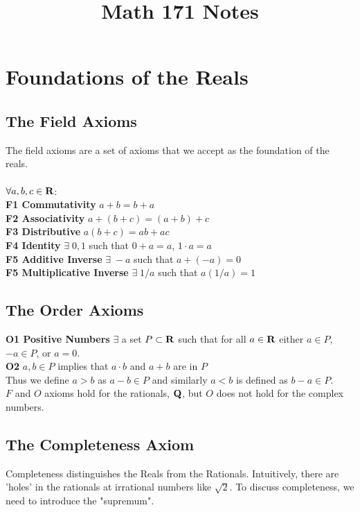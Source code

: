 \documentclass[12pt]{article}
\title{Math 171 Notes}
\begin{document}
\maketitle
\tableofcontents
\listoftodos
\newpage
\section{Foundations of the Reals}
  \subsection{The Field Axioms}
    The field axioms are a set of axioms that we accept as the foundation of the reals.\\\\
    $\forall a,b,c \in \mathbf{R}$:\\

    \textbf{F1 Commutativity}   $a+b = b+a$\\
    \textbf{F2 Associativity}  $a+(b +c) = (a+b)+c$\\
    \textbf{F3 Distributive}  $a(b +c) = ab+ac$\\
    \textbf{F4 Identity}  $\exists\;0,1$ such that $0 + a = a$, $1 \cdot a = a$ \\
    \textbf{F5 Additive Inverse}  $\exists\;-a$ such that $a + (-a) = 0$\\
    \textbf{F5 Multiplicative Inverse}  $\exists\;1/a$ such that $a(1/a) = 1$
  \subsection{The Order Axioms}
    \textbf{O1 Positive Numbers} $\exists$ a set $P \subset \mathbf {\mathbf{R}}$ such that for all $a \in \mathbf{R}$ either
    $a \in P$, $-a \in P$, or $a = 0$.\\
    \textbf{O2} $a,b \in P$ implies that $a\cdot b$ and $a + b$ are in $P$\\

    Thus we define $a > b$ as $a - b \in P$ and similarly $a < b$ is defined as $b - a \in P$.\\

    $F$ and $O$ axioms hold for the rationals, $\mathbf{Q}$, but $O$ does not hold for the complex numbers.
  \subsection{The Completeness Axiom}
    Completeness distinguishes the Reals from the Rationals. Intuitively, there are 'holes' in the rationals at
    irrational numbers like $\sqrt{2}$. To discuss completeness, we need to introduce the "supremum".\\
\end{document}
